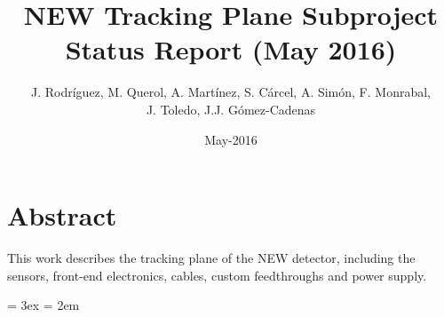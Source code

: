 \documentclass[12pt]{article}
\begin{document}
    \raggedbottom
    \sloppy {}
    \setlength{\parskip}{3ex}

\title{NEW Tracking Plane Subproject \\Status Report (May 2016)}

\author{J. Rodr\'iguez, M. Querol, A. Mart\'inez, S. C\'arcel, A. Sim\'on, F. Monrabal, \\ J. Toledo, J.J. G\'omez-Cadenas}
\date{May-2016}

\maketitle

\section*{Abstract}

This work describes the tracking plane of the NEW detector, including the sensors, front-end electronics, cables, custom feedthroughs and power supply. 
\clearpage

\tableofcontents

\clearpage









\newpage
\thispagestyle{empty}
\mbox{}

\bibitemsep = 3ex
\bibhang = 2em
\printbibliography[heading=bibintoc,title=Bibliography]
\end{document}

